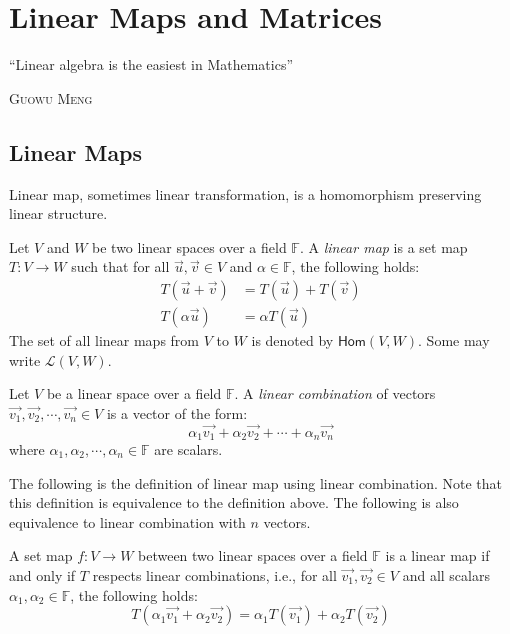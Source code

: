 \documentclass[
	11pt, %
	fleqn, %
	a4paper, %
]{LegrandOrangeBook}
\newcommand{\Hom}{\mathsf{Hom}} %
\newcommand{\F}{\mathbb{F}} %
\let\originalepigraph\epigraph
\renewcommand\epigraph[2]{\originalepigraph{#1}{\textsc{#2}}}
\begin{document}

\chapter{Linear Maps and Matrices}

\epigraph{``Linear algebra is the easiest in Mathematics''}{Guowu Meng}

\section{Linear Maps}

Linear map, sometimes linear transformation, is a homomorphism preserving linear structure.

\begin{definition}
    Let $V$ and $W$ be two linear spaces over a field $\F$. A \emph{linear map} is a set map $T: V \to W$ such that for all $\vec{u}, \vec{v} \in V$ and $\alpha \in \F$, the following holds:
    \[
        \begin{split}
            T(\vec{u} + \vec{v}) &= T(\vec{u}) + T(\vec{v}) \\
            T(\alpha \vec{u}) &= \alpha T(\vec{u})
        \end{split}
    \]
    The set of all linear maps from $V$ to $W$ is denoted by $\Hom(V, W)$. Some may write {$\mathcal{L}(V, W)$}.
\end{definition}

\begin{definition}
    Let $V$ be a linear space over a field $\F$. A \emph{linear combination} of vectors $\vec{v_1}, \vec{v_2}, \cdots, \vec{v_n} \in V$ is a vector of the form:
    \[
        \alpha_1 \vec{v_1} + \alpha_2 \vec{v_2} + \cdots + \alpha_n \vec{v_n}
    \]
    where $\alpha_1, \alpha_2, \cdots, \alpha_n \in \F$ are scalars.
\end{definition}

The following is the definition of linear map using linear combination. Note that this definition is equivalence to the definition above. The following is also equivalence to linear combination with $n$ vectors.

\begin{corollary}
    A set map $f: V \to W$ between two linear spaces over a field $\F$ is a linear map if and only if $T$ respects linear combinations, i.e., for all $\vec{v_1}, \vec{v_2} \in V$ and all scalars $\alpha_1, \alpha_2 \in \F$, the following holds:
    \[
        T(\alpha_1 \vec{v_1} + \alpha_2 \vec{v_2}) = \alpha_1 T(\vec{v_1}) + \alpha_2 T(\vec{v_2})
    \]
\end{corollary}
\end{document}
